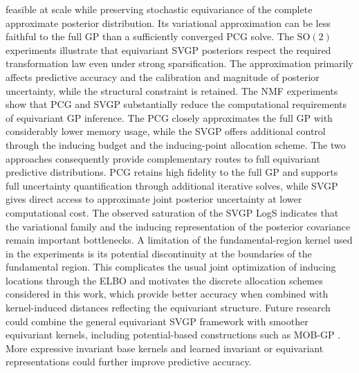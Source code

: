 \documentclass[11pt,a4paper]{article}
\begin{document}
feasible at scale while preserving stochastic equivariance of the complete approximate posterior distribution. Its variational approximation can be less faithful to the full GP than a sufficiently converged PCG solve. The $\mathrm{SO}(2)$ experiments illustrate that equivariant SVGP posteriors respect the required transformation law even under strong sparsification. The approximation primarily affects predictive accuracy and the calibration and magnitude of posterior uncertainty, while the structural constraint is retained. The NMF experiments show that PCG and SVGP substantially reduce the computational requirements of equivariant GP inference. The PCG closely approximates the full GP with considerably lower memory usage, while the SVGP offers additional control through the inducing budget and the inducing-point allocation scheme. The two approaches consequently provide complementary routes to full equivariant predictive distributions. PCG retains high fidelity to the full GP and supports full uncertainty quantification through additional iterative solves, while SVGP gives direct access to approximate joint posterior uncertainty at lower computational cost. The observed saturation of the SVGP LogS indicates that the variational family and the inducing representation of the posterior covariance remain important bottlenecks. A limitation of the fundamental-region kernel used in the experiments is its potential discontinuity at the boundaries of the fundamental region. This complicates the usual joint optimization of inducing locations through the ELBO and motivates the discrete allocation schemes considered in this work, which provide better accuracy when combined with kernel-induced distances reflecting the equivariant structure. Future research could combine the general equivariant SVGP framework with smoother equivariant kernels, including potential-based constructions such as MOB-GP \citep{Sun_2022}. More expressive invariant base kernels and learned invariant or equivariant representations could further improve predictive accuracy.
\end{document}
